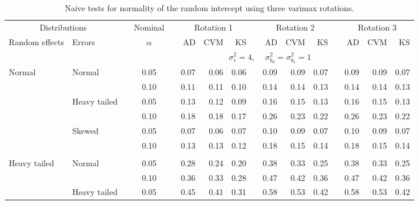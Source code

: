 \documentclass[12pt]{article} %
\begin{document}
\begin{table}[ht]
\begin{scriptsize}
\begin{center}
\begin{tabular}{ll p{.1cm} c p{.1cm} rrr p{.1cm} rrr p{.1cm} rrr}
   \hline
\end{tabular}
\end{center}
\end{scriptsize}
\end{table}


\begin{table}[ht]
\caption{Naive tests for normality of the random intercept using three varimax rotations.}
\begin{scriptsize}
\begin{center}
\begin{tabular}{ll p{.1cm} c p{.1cm} rrr p{.1cm} rrr p{.1cm} rrr}
  \hline
  \multicolumn{2}{c}{Distributions}& & Nominal & &  \multicolumn{3}{c}{Rotation 1} & & \multicolumn{3}{c}{Rotation 2} & & \multicolumn{3}{c}{Rotation 3}\\ \cline{1-2} \cline{6-8} \cline{10-12} \cline{14-16}
  Random effects & Errors & & $\alpha$ & & AD & CVM & KS & & AD & CVM & KS & & AD & CVM & KS \\ 
   \hline
& && && \multicolumn{9}{c}{$\sigma_{\varepsilon}^2 = 4$, \ \ $\sigma_{b_0}^2 = \sigma_{b_1}^2 = 1$} \\ \cline{6-16}
\rowcolor{gray!20}Normal       & Normal       && 0.05 &&   0.07 & 0.06 & 0.06 && 0.09 & 0.09 & 0.07 && 0.09 & 0.09 & 0.07 \\ 
\rowcolor{gray!20}             &              && 0.10 &&   0.11 & 0.11 & 0.10 && 0.14 & 0.14 & 0.13 && 0.14 & 0.14 & 0.13 \\ 
\rowcolor{gray!20}             & Heavy tailed && 0.05 &&   0.13 & 0.12 & 0.09 && 0.16 & 0.15 & 0.13 && 0.16 & 0.15 & 0.13 \\ 
\rowcolor{gray!20}             &              && 0.10 &&   0.18 & 0.18 & 0.17 && 0.26 & 0.23 & 0.22 && 0.26 & 0.23 & 0.22 \\ 
\rowcolor{gray!20}             & Skewed       && 0.05 &&   0.07 & 0.06 & 0.07 && 0.10 & 0.09 & 0.07 && 0.10 & 0.09 & 0.07 \\ 
\rowcolor{gray!20}             &              && 0.10 &&   0.13 & 0.13 & 0.12 && 0.18 & 0.15 & 0.14 && 0.18 & 0.15 & 0.14 \\ 
             &&&&&&&&&&&&&&&\\
Heavy tailed & Normal       && 0.05 &&   0.28 & 0.24 & 0.20 && 0.38 & 0.33 & 0.25 && 0.38 & 0.33 & 0.25 \\ 
             &              && 0.10 &&   0.36 & 0.33 & 0.28 && 0.47 & 0.42 & 0.36 && 0.47 & 0.42 & 0.36 \\ 
             & Heavy tailed && 0.05 &&   0.45 & 0.41 & 0.31 && 0.58 & 0.53 & 0.42 && 0.58 & 0.53 & 0.42 \\ 

\end{tabular}
\end{center}
\end{scriptsize}
\end{table}
\end{document}
